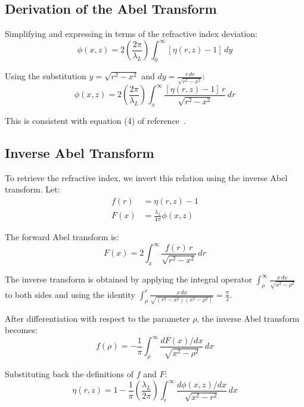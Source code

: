 \documentclass[11pt,a4paper]{article}
\begin{document}
\subsection{Derivation of the Abel Transform}

Simplifying and expressing in terms of the refractive index deviation:
\begin{equation}
\phi(x,z) = 2\left(\frac{2\pi}{\lambda_L}\right)\int_0^{\infty}[\eta(r,z) - 1] \, dy
\end{equation}

Using the substitution $y = \sqrt{r^2 - x^2}$ and $dy = \frac{r \, dr}{\sqrt{r^2 - x^2}}$:
\begin{equation}
\phi(x,z) = 2\left(\frac{2\pi}{\lambda_L}\right)\int_x^{\infty} \frac{[\eta(r,z) - 1] \, r}{\sqrt{r^2 - x^2}} \, dr
\end{equation}

This is consistent with equation (4) of reference~\cite{gonzalez2012plasma}.

\subsection{Inverse Abel Transform}

To retrieve the refractive index, we invert this relation using the inverse Abel transform. Let:
\begin{align}
f(r) &= \eta(r,z) - 1 \\
F(x) &= \frac{\lambda_L}{4\pi}\phi(x,z)
\end{align}

The forward Abel transform is:
\begin{equation}
F(x) = 2\int_x^{\infty} \frac{f(r) \, r}{\sqrt{r^2 - x^2}} \, dr
\end{equation}

The inverse transform is obtained by applying the integral operator $\int_{\rho}^{\infty} \frac{x \, dx}{\sqrt{x^2 - \rho^2}}$ to both sides and using the identity $\int_{\rho}^{r} \frac{x \, dx}{\sqrt{(r^2-x^2)(x^2-\rho^2)}} = \frac{\pi}{2}$.

After differentiation with respect to the parameter $\rho$, the inverse Abel transform becomes:
\begin{equation}
f(\rho) = -\frac{1}{\pi} \int_{\rho}^{\infty} \frac{dF(x)/dx}{\sqrt{x^2 - \rho^2}} \, dx
\end{equation}

Substituting back the definitions of $f$ and $F$:
\begin{equation}
\boxed{\eta(r,z) = 1 - \frac{1}{\pi}\left(\frac{\lambda_L}{2\pi}\right)\int_r^{\infty} \frac{d\phi(x,z)/dx}{\sqrt{x^2 - r^2}} \, dx}
\end{equation}
\end{document}
